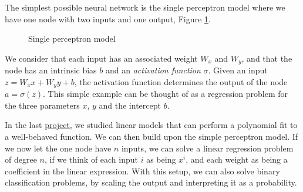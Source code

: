 \documentclass[aps,reprint,superscriptaddress,nofootinbib]{revtex4-2}
\begin{document}
    The simplest possible neural network is the single perceptron model where we have one node with two inputs and one output, Figure \ref{fig:simple_percep}.
    \begin{figure}[htp]
        \centering
        \caption{Single perceptron model}
        \label{fig:simple_percep}
    \end{figure}
    We consider that each input has an associated weight \(W_x\) and \(W_y\), and that the node has an intrinsic bias \(b\) and an \textit{activation function} \(\sigma\). Given an input \(z = W_xx + W_yy + b\), the activation function determines the output of the node \(a = \sigma(z)\). This simple example can be thought of as a regression problem for the three parameters \(x\), \(y\) and the intercept \(b\). 
    
    In the last \href{https://github.com/jgci2000/FYS-STK4155-projects/blob/master/project_1/doc/report_project1.pdf}{project}, we studied linear models that can perform a polynomial fit to a well-behaved function. We can then build upon the simple perceptron model. If we now let the one node have \(n\) inputs, we can solve a linear regression problem of degree \(n\), if we think of each input \(i\) as being \(x^i\), and each weight as being a coefficient in the linear expression. With this setup, we can also solve binary classification problems, by scaling the output and interpreting it as a probability.
    
    
\end{document}
